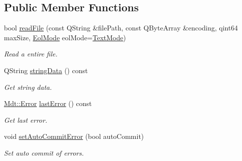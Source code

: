 \subsection*{Public Member Functions}
\begin{DoxyCompactItemize}
\item 
bool \hyperlink{class_mdt_1_1_plain_text_1_1_file_reader_ae382363945e70dd800d5a9a41442795f}{read\+File} (const Q\+String \&file\+Path, const Q\+Byte\+Array \&encoding, qint64 max\+Size, \hyperlink{class_mdt_1_1_plain_text_1_1_file_reader_ad9b4b7e046f899c9d13e19434d68ef10}{Eol\+Mode} eol\+Mode=\hyperlink{class_mdt_1_1_plain_text_1_1_file_reader_ad9b4b7e046f899c9d13e19434d68ef10a80c0cede59c86d5daac618c3efd559cd}{Text\+Mode})\hypertarget{class_mdt_1_1_plain_text_1_1_file_reader_ae382363945e70dd800d5a9a41442795f}{}\label{class_mdt_1_1_plain_text_1_1_file_reader_ae382363945e70dd800d5a9a41442795f}

\begin{DoxyCompactList}\small\item\em Read a entire file. \end{DoxyCompactList}\item 
Q\+String \hyperlink{class_mdt_1_1_plain_text_1_1_file_reader_a9453c731da657581d58188106461e32b}{string\+Data} () const \hypertarget{class_mdt_1_1_plain_text_1_1_file_reader_a9453c731da657581d58188106461e32b}{}\label{class_mdt_1_1_plain_text_1_1_file_reader_a9453c731da657581d58188106461e32b}

\begin{DoxyCompactList}\small\item\em Get string data. \end{DoxyCompactList}\item 
\hyperlink{class_mdt_1_1_error}{Mdt\+::\+Error} \hyperlink{class_mdt_1_1_plain_text_1_1_file_reader_aa74ba00e8fad5c4834dc63a354416192}{last\+Error} () const \hypertarget{class_mdt_1_1_plain_text_1_1_file_reader_aa74ba00e8fad5c4834dc63a354416192}{}\label{class_mdt_1_1_plain_text_1_1_file_reader_aa74ba00e8fad5c4834dc63a354416192}

\begin{DoxyCompactList}\small\item\em Get last error. \end{DoxyCompactList}\item 
void \hyperlink{class_mdt_1_1_plain_text_1_1_file_reader_a3183d1d629a19353d3d0e1c2a238cc2f}{set\+Auto\+Commit\+Error} (bool auto\+Commit)
\begin{DoxyCompactList}\small\item\em Set auto commit of errors. \end{DoxyCompactList}\end{DoxyCompactItemize}


